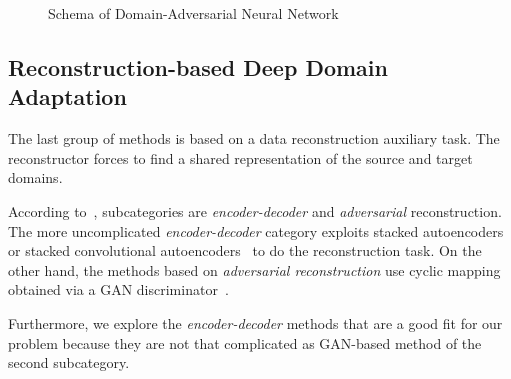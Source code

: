 \begin{figure}
\begin{center}
\end{center}
\caption{Schema of Domain-Adversarial Neural Network}
\end{figure}

\subsection{Reconstruction-based Deep Domain Adaptation}
\label{reconstruction_da}

The last group of methods is based on a data reconstruction auxiliary task.
The reconstructor forces to find a shared representation of the source and target domains.

According to~\cite{wang2018}, subcategories are \textit{encoder-decoder} and
\textit{adversarial} reconstruction.
The more uncomplicated \textit{encoder-decoder} category exploits stacked autoencoders~\cite{vincent2008} or stacked convolutional autoencoders~\cite{masci2011}
to do the reconstruction task.
On the other hand, the methods based on \textit{adversarial reconstruction} use cyclic mapping obtained via a GAN discriminator~\cite{goodfellow2014}.

Furthermore, we explore the \textit{encoder-decoder} methods that are a good fit for our problem
because they are not that complicated as GAN-based method of the second subcategory.

